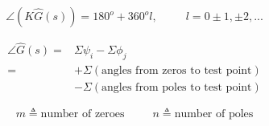 \documentclass[twocolumn, 12pt]{article}    %
\begin{document}
    \begin{equation*}
        \angle (K\hat{G}(s)) = 180^o + 360^o l, \hspace{30pt} l = 0 \pm 1, \pm 2, ...
    \end{equation*}
    
    \begin{align*}
        \angle \hat{G}(s) =& \Sigma \psi_i - \Sigma \phi_j\\
        =&+\Sigma(\text{angles from zeros to test point})\\ &- \Sigma(\text{angles from poles to test point})
    \end{align*}
    
    \begin{equation*}
        m \triangleq\text{number of zeroes} \hspace{30pt} n \triangleq \text{number of poles}
    \end{equation*}
    
\end{document}
